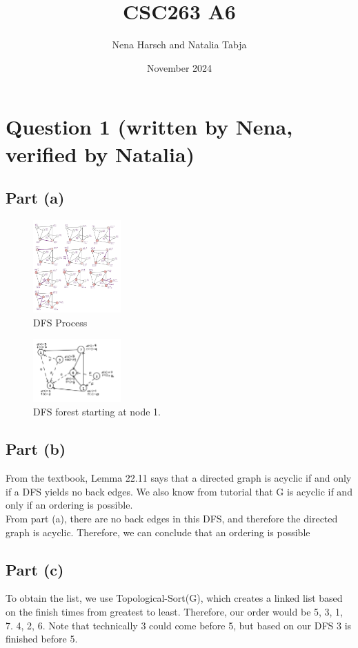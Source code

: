 \documentclass{article}
\title{CSC263 A6}
\author{Nena Harsch and Natalia Tabja}
\date{November 2024}
\begin{document}
\maketitle
\section*{Question 1 (written by Nena, verified by Natalia)}

\subsection*{Part (a)}
\begin{figure}[ht!]
        \centering
        \includegraphics[width=0.3\textwidth]{Q1a.1.JPG}
        \caption{DFS Process}
        \label{f:Q1a.1}
\end{figure}

\begin{figure}[ht!]
        \centering
        \includegraphics[width=0.3\textwidth]{Q1a.2.JPG}
        \caption{DFS forest starting at node 1.}
        \label{f:Q1a.2}
\end{figure}

\subsection*{Part (b)}
From the textbook, Lemma 22.11 says that a directed graph is acyclic if and only if a DFS yields no back edges. We also know from tutorial that G is acyclic if and only if an ordering is possible.\\
From part (a), there are no back edges in this DFS, and therefore the directed graph is acyclic. Therefore, we can conclude that an ordering is possible

\subsection*{Part (c)}
To obtain the list, we use Topological-Sort(G), which creates a linked list based on the finish times from greatest to least. Therefore, our order would be 5, 3, 1, 7. 4, 2, 6. Note that technically 3 could come before 5, but based on our DFS 3 is finished before 5.
\end{document}
